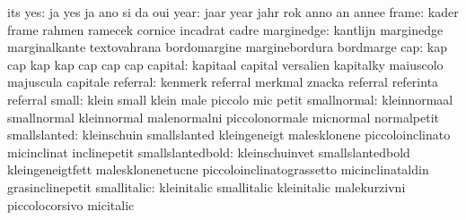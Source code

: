                            its
                      yes: ja                        yes
                           ja                        ano
                           si                        da
                           oui
                     year: jaar                      year
                           jahr                      rok
                           anno                      an
                           annee
                    frame: kader                     frame
                           rahmen                    ramecek
                           cornice                   incadrat
                           cadre
               marginedge: kantlijn                  marginedge
                           marginalkante             textovahrana
                           bordomargine              marginebordura
                           bordmarge
                      cap: kap                       cap
                           kap                       kap
                           cap                       cap
                           cap
                  capital: kapitaal                  capital
                           versalien                 kapitalky
                           maiuscolo                 majuscula
                           capitale
                 referral: kenmerk                   referral
                           merkmal                   znacka
                           referral                  referinta
                           referral
                    small: klein                     small
                           klein                     male
                           piccolo                   mic
                           petit
              smallnormal: kleinnormaal              smallnormal
                           kleinnormal               malenormalni
                           piccolonormale            micnormal
                           normalpetit
             smallslanted: kleinschuin               smallslanted
                           kleingeneigt              malesklonene
                           piccoloinclinato          micinclinat
                           inclinepetit
         smallslantedbold: kleinschuinvet            smallslantedbold
                           kleingeneigtfett          malesklonenetucne
                           piccoloinclinatograssetto micinclinataldin
                           grasinclinepetit
              smallitalic: kleinitalic               smallitalic
                           kleinitalic               malekurzivni
                           piccolocorsivo            micitalic
